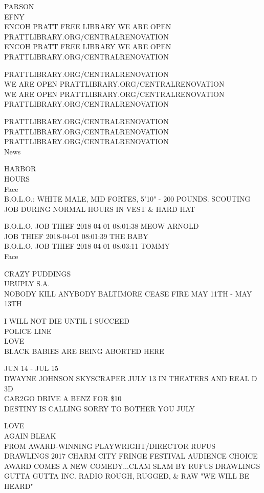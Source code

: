 \documentclass[10pt,letterpaper]{article}
\begin{document}
PARSON\\
EFNY\\
ENCOH PRATT FREE LIBRARY WE ARE OPEN PRATTLIBRARY.ORG/CENTRALRENOVATION\\
ENCOH PRATT FREE LIBRARY WE ARE OPEN PRATTLIBRARY.ORG/CENTRALRENOVATION

PRATTLIBRARY.ORG/CENTRALRENOVATION\\
WE ARE OPEN PRATTLIBRARY.ORG/CENTRALRENOVATION\\
WE ARE OPEN PRATTLIBRARY.ORG/CENTRALRENOVATION\\
PRATTLIBRARY.ORG/CENTRALRENOVATION

PRATTLIBRARY.ORG/CENTRALRENOVATION\\
PRATTLIBRARY.ORG/CENTRALRENOVATION\\
PRATTLIBRARY.ORG/CENTRALRENOVATION\\
News

HARBOR\\
HOURS\\
Face\\
B.O.L.O.: WHITE MALE, MID FORTES, 5'10" {-} 200 POUNDS.  SCOUTING JOB DURING NORMAL HOURS IN VEST \& HARD HAT

B.O.L.O. JOB THIEF 2018{-}04{-}01 08:01:38 MEOW ARNOLD\\
JOB THIEF 2018{-}04{-}01 08:01:39 THE BABY\\
B.O.L.O. JOB THIEF 2018{-}04{-}01 08:03:11 TOMMY\\
Face

CRAZY PUDDINGS\\
URUPLY S.A.\\
NOBODY KILL ANYBODY BALTIMORE CEASE FIRE MAY 11TH {-} MAY 13TH

I WILL NOT DIE UNTIL I SUCCEED\\
POLICE LINE\\
LOVE\\
BLACK BABIES ARE BEING ABORTED HERE

JUN 14 {-} JUL 15\\
DWAYNE JOHNSON SKYSCRAPER JULY 13 IN THEATERS AND REAL D 3D\\
CAR2GO DRIVE A BENZ FOR \$10\\
DESTINY IS CALLING SORRY TO BOTHER YOU JULY

LOVE\\
AGAIN BLEAK\\
FROM AWARD{-}WINNING PLAYWRIGHT/DIRECTOR RUFUS DRAWLINGS 2017 CHARM CITY FRINGE FESTIVAL AUDIENCE CHOICE AWARD COMES A NEW COMEDY...CLAM SLAM BY RUFUS DRAWLINGS\\
GUTTA GUTTA INC. RADIO ROUGH, RUGGED, \& RAW "WE WILL BE HEARD"
\end{document}
